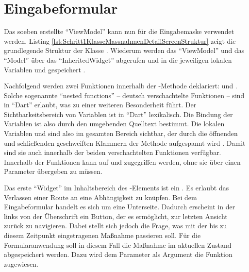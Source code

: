 \ifodd\value{page}\hbox{}\newpage\fi
\section{Eingabeformular}
  
Das soeben erstellte \enquote{ViewModel} kann nun für die Eingabemaske verwendet werden.
Listing \ref{lst:Schritt1KlasseMassnahmenDetailScreenStruktur} zeigt die grundlegende Struktur der Klasse .
Wiederum werden das \enquote{ViewModel} und das \enquote{Model} über das \enquote{InheritedWidget}  abgerufen
und in die jeweiligen lokalen Variablen  und  gespeichert .

Nachfolgend werden zwei Funktionen innerhalb der -Methode deklariert:
  und  .
Solche sogenannte \enquote{nested functions} -- deutsch
verschachtelte Funktionen -- sind in \enquote{Dart} erlaubt, was zu einer weiteren Besonderheit führt.
Der Sichtbarkeitsbereich von Variablen ist in \enquote{Dart} lexikalisch.
Die Bindung der Variablen ist also durch den umgebenden Quelltext bestimmt.
Die lokalen Variablen  und  sind also im gesamten Bereich sichtbar,
der durch die öffnenden und schließenden geschweiften Klammern der Methode  aufgespannt wird .
Damit sind sie auch innerhalb der beiden verschachtelten Funktionen verfügbar.
Innerhalb der Funktionen kann auf  und  zugegriffen werden, ohne sie über einen Parameter übergeben zu müssen.


Das erste \enquote{Widget} im Inhaltsbereich des -Elements ist ein  .
Es erlaubt das Verlassen einer Route an eine Abhängigkeit zu knüpfen.
Bei dem Eingabeformular handelt es sich um eine Unterseite.
Dadurch erscheint in der   links von der Überschrift ein Button, der es ermöglicht,
zur letzten Ansicht zurück zu navigieren.
Dabei stellt sich jedoch die Frage, was mit der bis zu diesem Zeitpunkt eingetragenen Maßnahme passieren soll.
Für die Formularanwendung soll in diesem Fall die Maßnahme im aktuellen Zustand abgespeichert werden.
Dazu wird dem Parameter  als Argument die Funktion  zugewiesen.

